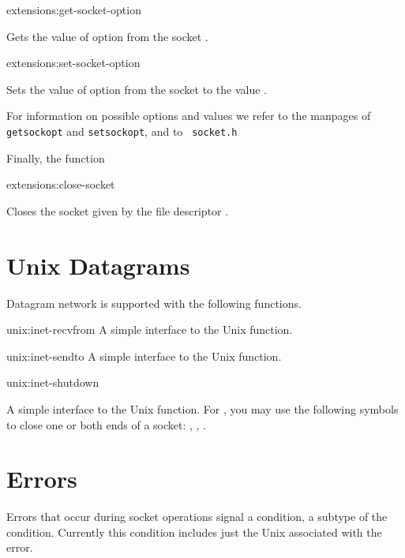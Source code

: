 \begin{defun}{extensions:}{get-socket-option}{%
    }
  
  Gets the value of option  from the socket .

\end{defun}

\begin{defun}{extensions:}{set-socket-option}{%
    }
  
  Sets the value of option  from the socket 
  to the value .

\end{defun}

For information on possible options and values we refer to the
manpages of {\tt getsockopt} and {\tt setsockopt}, and to {\tt
 socket.h}

Finally, the function

\begin{defun}{extensions:}{close-socket}{%
    }

  Closes the socket given by the file descriptor .

\end{defun}

\section{Unix Datagrams}

Datagram network is supported with the following functions.

\begin{defun}{unix:}{inet-recvfrom}{%
	}
   A simple interface to the Unix  function.
\end{defun}

\begin{defun}{unix:}{inet-sendto}{%
	}
   A simple interface to the Unix  function.
\end{defun}

\begin{defun}{unix:}{inet-shutdown}{%
	}

   A simple interface to the Unix  function.  For
   , you may use the following symbols to close one or
   both ends of a socket: , ,
   .

\end{defun}

\section{Errors}

Errors that occur during socket operations signal a
 condition, a subtype of the 
condition.  Currently this condition includes just the Unix
 associated with the error.
